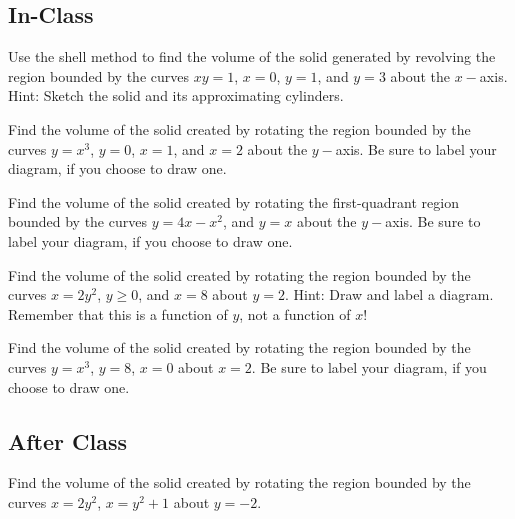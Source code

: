\documentclass[notes]{subfiles}
\begin{document}
	\subsection*{In-Class}
		\begin{ex}
			Use the shell method to find the volume of the solid generated by revolving the region bounded by the curves $xy = 1$, $x = 0$, $y = 1$, and $y = 3$ about the $x-$axis.  Hint: Sketch the solid and its approximating cylinders.
		\end{ex}
			\newpage
			
			
		\begin{ex}
			Find the volume of the solid created by rotating the region bounded by the curves $y = x^3$, $y = 0$, $x = 1$, and $x = 2$ about the $y-$axis.  Be sure to label your diagram, if you choose to draw one.
		\end{ex}

			
		\begin{ex}
			Find the volume of the solid created by rotating the first-quadrant region bounded by the curves $y = 4x-x^2$, and $y = x$ about the $y-$axis.  Be sure to label your diagram, if you choose to draw one.
		\end{ex}
			\newpage
			
		\begin{ex}
			Find the volume of the solid created by rotating the region bounded by the curves $x = 2y^2$, $y\geq 0$, and $x=8$ about $y = 2$.  Hint: Draw and label a diagram.  Remember that this is a function of $y$, not a function of $x$!
		\end{ex}

			
		\begin{ex}
			Find the volume of the solid created by rotating the region bounded by the curves $y = x^3$, $y = 8$, $x = 0$ about $x = 2$.  Be sure to label your diagram, if you choose to draw one.
		\end{ex}
			\newpage
			
	\subsection*{After Class}
		
		\begin{ex}
			Find the volume of the solid created by rotating the region bounded by the curves $x = 2y^2$, $x = y^2 + 1$ about $y = -2$.
		\end{ex}
			
\end{document}
